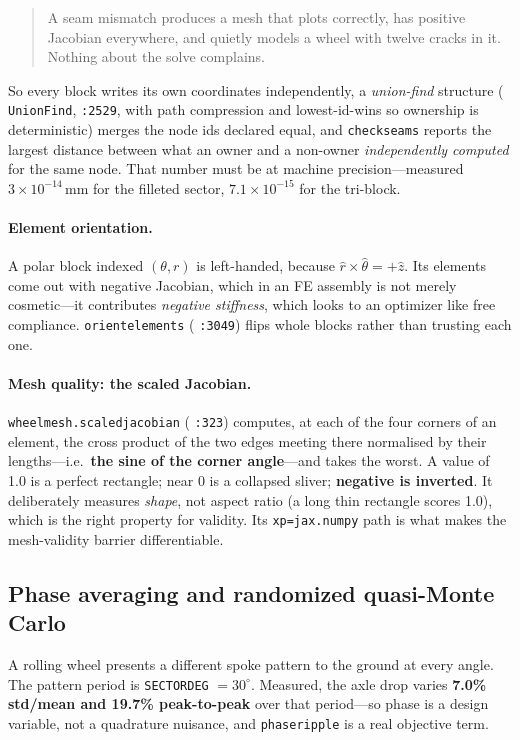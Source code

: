\documentclass[11pt,a4paper]{article}
\DeclareRobustCommand{\code}[1]{%
  \texttt{\small\def\_{\textunderscore\discretionary{}{}{}}#1}}
\begin{document}
\begin{quote}
A seam mismatch produces a mesh that plots correctly, has positive Jacobian everywhere,
and quietly models a wheel with twelve cracks in it. Nothing about the solve complains.
\end{quote}

So every block writes its own coordinates independently, a \emph{union-find} structure
(\code{\_UnionFind}, \code{:2529}, with path compression and lowest-id-wins so ownership
is deterministic) merges the node ids declared equal, and \code{check\_seams} reports
the largest distance between what an owner and a non-owner \emph{independently
computed} for the same node. That number must be at machine precision---measured
$3\times10^{-14}$\,mm for the filleted sector, $7.1\times10^{-15}$ for the tri-block.

\paragraph{Element orientation.}
A polar block indexed $(\theta, r)$ is left-handed, because
$\hat r \times \hat\theta = +\hat z$. Its elements come out with negative Jacobian,
which in an FE assembly is not merely cosmetic---it contributes \emph{negative
stiffness}, which looks to an optimizer like free compliance.
\code{\_orient\_elements} (\code{:3049}) flips whole blocks rather than trusting each
one.

\paragraph{Mesh quality: the scaled Jacobian.}
\code{wheel\_mesh.scaled\_jacobian} (\code{:323}) computes, at each of the four corners
of an element, the cross product of the two edges meeting there normalised by their
lengths---i.e.\ \textbf{the sine of the corner angle}---and takes the worst. A value of
1.0 is a perfect rectangle; near 0 is a collapsed sliver; \textbf{negative is
inverted}. It deliberately measures \emph{shape}, not aspect ratio (a long thin
rectangle scores 1.0), which is the right property for validity. Its
\code{xp=jax.numpy} path is what makes the mesh-validity barrier differentiable.

\subsection{Phase averaging and randomized quasi-Monte Carlo}
\label{sec:phase}

A rolling wheel presents a different spoke pattern to the ground at every angle. The
pattern period is \code{SECTOR\_DEG} $= 30^\circ$. Measured, the axle drop varies
\textbf{7.0\% std/mean and 19.7\% peak-to-peak} over that period---so phase is a design
variable, not a quadrature nuisance, and \code{phase\_ripple} is a real objective term.
\end{document}
